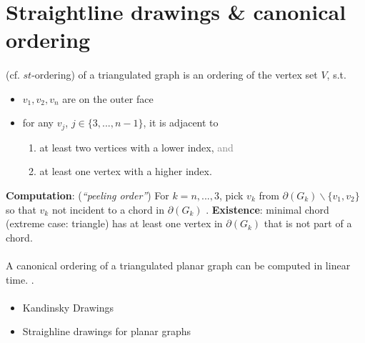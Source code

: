 \documentclass[10pt,twocolumn]{article}
\begin{document}
\section{Straightline drawings \& canonical ordering}


\paragraph{} (cf. $st$-ordering) of a triangulated graph
is an ordering of the vertex set $V$, s.t.
\begin{itemize}
\item $v_1, v_2, v_n$ are on the outer face
\item for any $v_j$, $j \in \{3, ..., n-1\}$, it is adjacent to
  \begin{enumerate}
  \item at least two vertices with a lower index, \textcolor{gray}{and}
  \item at least one vertex with a higher index.
  \end{enumerate}
\end{itemize}
\textbf{Computation}: (\textit{``peeling order''}) For $k=n, ..., 3$, pick $v_k$ from
$\partial(G_k) \backslash \{v_1, v_2\}$ so that $v_k$ not incident to a chord in
$\partial(G_k)$ . \textbf{Existence}: minimal chord (extreme case: triangle) has at
least one vertex in $\partial(G_k)$ that is not part of a chord.

\paragraph{} A canonical ordering of a triangulated planar graph can
be computed in linear time. .

\paragraph{}
\begin{itemize}
\item Kandinsky Drawings
\item Straighline drawings for planar graphs
\end{itemize}
\end{document}
